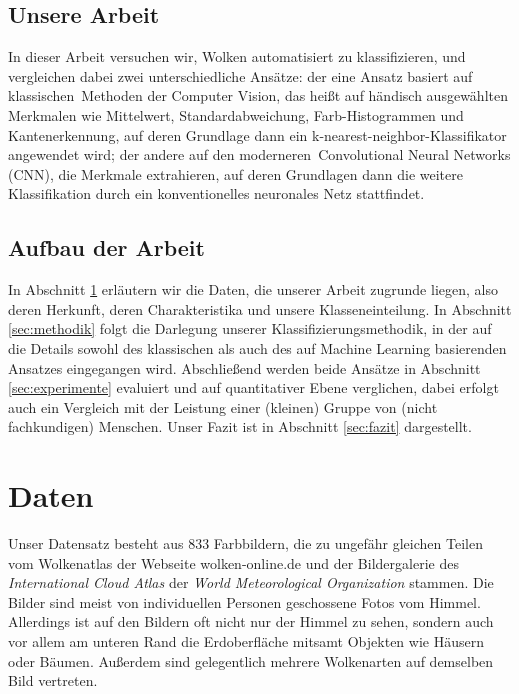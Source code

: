 \documentclass[a4,german]{article}
\begin{document}
\subsection{Unsere Arbeit}

In dieser Arbeit versuchen wir, Wolken automatisiert zu klassifizieren, und vergleichen dabei zwei unterschiedliche Ansätze:
der eine Ansatz basiert auf \glqq klassischen\grqq\ Methoden der Computer Vision, das heißt auf händisch ausgewählten Merkmalen wie Mittelwert, Standardabweichung, Farb-Histogrammen und Kantenerkennung, auf deren Grundlage dann ein k-nearest-neighbor-Klassifikator angewendet wird;
der andere auf den \glqq moderneren\grqq\ Convolutional Neural Networks (CNN), die Merkmale extrahieren, auf deren Grundlagen dann die weitere Klassifikation durch ein konventionelles neuronales Netz stattfindet.


\subsection{Aufbau der Arbeit}

In Abschnitt \ref{sec:daten} erläutern wir die Daten, die unserer Arbeit zugrunde liegen, also deren Herkunft, deren Charakteristika und unsere Klasseneinteilung.
In Abschnitt \ref{sec:methodik} folgt die Darlegung unserer Klassifizierungsmethodik, in der auf die Details sowohl des klassischen als auch des auf Machine Learning basierenden Ansatzes eingegangen wird.
Abschließend werden beide Ansätze in Abschnitt \ref{sec:experimente} evaluiert und auf quantitativer Ebene verglichen, dabei erfolgt auch ein Vergleich mit der Leistung einer (kleinen) Gruppe von (nicht fachkundigen) Menschen.
Unser Fazit ist in Abschnitt \ref{sec:fazit} dargestellt.
 

\section{Daten}
\label{sec:daten}

Unser Datensatz besteht aus 833 Farbbildern, die zu ungefähr gleichen Teilen vom Wolkenatlas der Webseite wolken-online.de \cite{wolkenonline} und der Bildergalerie des \emph{International Cloud Atlas} der \emph{World Meteorological Organization} \cite{wmo:images} stammen.
Die Bilder sind meist von individuellen Personen geschossene Fotos vom Himmel.
Allerdings ist auf den Bildern oft nicht nur der Himmel zu sehen, sondern auch vor allem am unteren Rand die Erdoberfläche mitsamt Objekten wie Häusern oder Bäumen.
Außerdem sind gelegentlich mehrere Wolkenarten auf demselben Bild vertreten.
\end{document}
